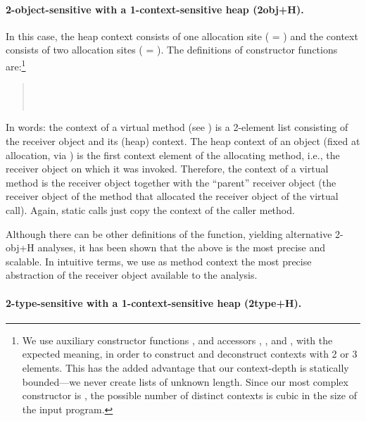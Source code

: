 \paragraph{2-object-sensitive with a 1-context-sensitive heap (2obj+H).}
In this case, the heap context consists of one allocation site
( = ) and the context consists of two allocation
sites ( = ). The definitions of constructor
functions are:\footnote{We use auxiliary constructor functions
,  and accessors ,
, and , with the expected meaning, in order
to construct and deconstruct contexts with 2 or 3 elements. This has
the added advantage that our context-depth is statically bounded---we
never create lists of unknown length. Since our most complex constructor
is , the possible number of distinct contexts is cubic in
the size of the input program.}
\begin{quote}
 \\
 \\
\end{quote}
In words: the context of a virtual method (see ) is a
2-element list consisting of the receiver object and its (heap)
context. The heap context of an object (fixed at allocation, via
) is the first context element of the allocating
method, i.e., the receiver object on which it was invoked. Therefore,
the context of a virtual method is the receiver object together with
the ``parent'' receiver object (the receiver object of the method that
allocated the receiver object of the virtual call). Again, static
calls just copy the context of the caller method.

Although there can be other definitions of the 
function, yielding alternative 2-obj+H analyses, it has been shown
\cite{popl:2011:Smaragdakis} that the above is the most precise and
scalable. In intuitive terms, we use as method context the most
precise abstraction of the receiver object available to the analysis.


\paragraph{2-type-sensitive with a 1-context-sensitive heap (2type+H).}

